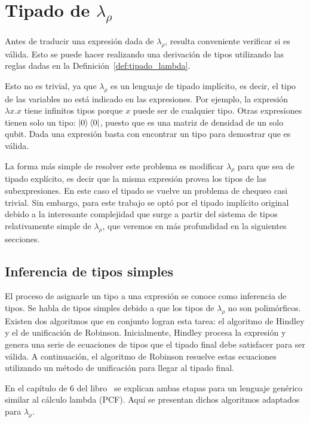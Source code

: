 \chapter{\texorpdfstring{Tipado de $\lambda_\rho$}{Tipado de Lambda Rho}}\label{ch:tipado}

Antes de traducir una expresión dada de $\lambda_\rho$, resulta conveniente verificar si es válida. Esto se puede hacer realizando una derivación de tipos utilizando las reglas dadas en la Definición~\ref{def:tipado_lambda}.

Esto no es trivial, ya que $\lambda_\rho$ es un lenguaje de tipado implícito, es decir, el tipo de las variables no está indicado en las expresiones. Por ejemplo, la expresión $\lambda x.x$ tiene infinitos tipos porque $x$ puede ser de cualquier tipo. Otras expresiones tienen solo un tipo: $\ket{0}\bra{0}$, puesto que es una matriz de densidad de un solo qubit. Dada una expresión basta con encontrar un tipo para demostrar que es válida.

La forma más simple de resolver este problema es modificar $\lambda_\rho$ para que sea de tipado explícito, es decir que la misma expresión provea los tipos de las subexpresiones. En este caso el tipado se vuelve un problema de chequeo casi trivial. Sin embargo, para este trabajo se optó por el tipado implícito original debido a la interesante complejidad que surge a partir del sistema de tipos relativamente simple de $\lambda_\rho$, que veremos en más profundidad en la siguientes secciones. 

\section{Inferencia de tipos simples}

El proceso de asignarle un tipo a una expresión se conoce como inferencia de tipos. Se habla de tipos simples debido a que los tipos de $\lambda_\rho$ no son polimórficos. Existen dos algoritmos que en conjunto logran esta tarea: el algoritmo de Hindley y el de unificación de Robinson. Inicialmente, Hindley procesa la expresión y genera una serie de ecuaciones de tipos que el tipado final debe satisfacer para ser válida. A continuación, el algoritmo de Robinson resuelve estas ecuaciones utilizando un método de unificación para llegar al tipado final.

En el capítulo de 6 del libro~\cite{intro_programming_languages} se explican ambas etapas para un lenguaje genérico similar al cálculo lambda (PCF). Aquí se presentan dichos algoritmos adaptados para $\lambda_\rho$.

